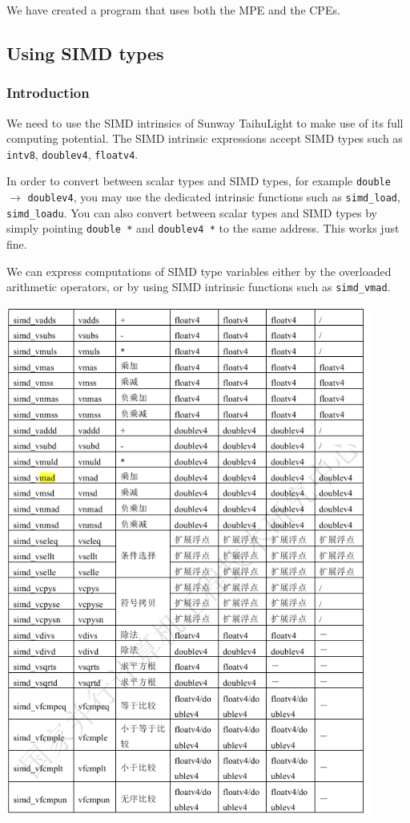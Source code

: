 We have created a program that uses both the MPE and the CPEs.


\subsection{Using SIMD types}
\subsubsection{Introduction}

We need to use the SIMD intrinsics of Sunway TaihuLight to make use of its full computing potential.
The SIMD intrinsic expressions accept SIMD types such as
\verb`intv8`,
\verb`doublev4`,
\verb`floatv4`.

In order to convert between scalar types and SIMD types, for example
\verb`double` $\to$ \verb`doublev4`, you may use the dedicated intrinsic functions such as
 \verb`simd_load`,  \verb`simd_loadu`.
You can also
convert between scalar types and SIMD types by
simply pointing \verb`double *` and  \verb`doublev4 *` to the same address. This works just fine.

We can express
computations of
SIMD type variables either by the overloaded arithmetic operators, or by using SIMD intrinsic functions such as
\verb`simd_vmad`.
\begin{center}
  \includegraphics[width=12cm]{figure/sunway-simd.png}
  \end{center}

